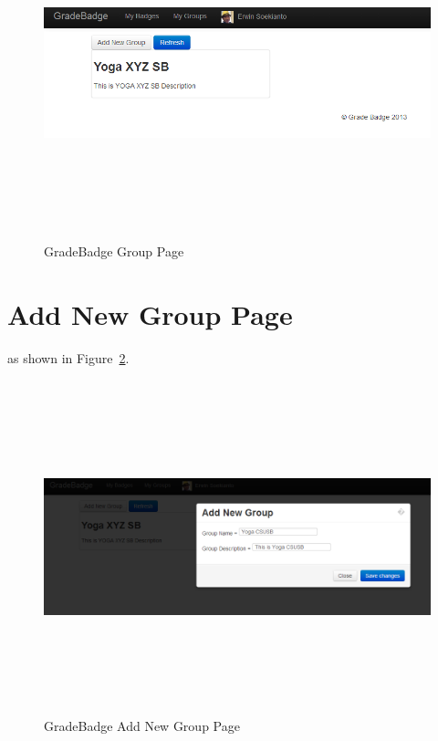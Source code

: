 \vspace{3em}
\begin{figure}[H]
\begin{center}
\includegraphics[height=3.8in,width=6.5in]{images/group-page1.png}
\caption{GradeBadge Group Page}
\label{fig:group-page1}
\end{center}
\end{figure}

\newpage
\section{Add New Group Page}
 as shown in Figure~\ref{fig:add-new-group}. 

\vspace{3em}
\begin{figure}[H]
\begin{center}
\includegraphics[height=3.8in,width=6.5in]{images/add-new-group.png}
\caption{GradeBadge Add New Group Page}
\label{fig:add-new-group}
\end{center}
\end{figure}

